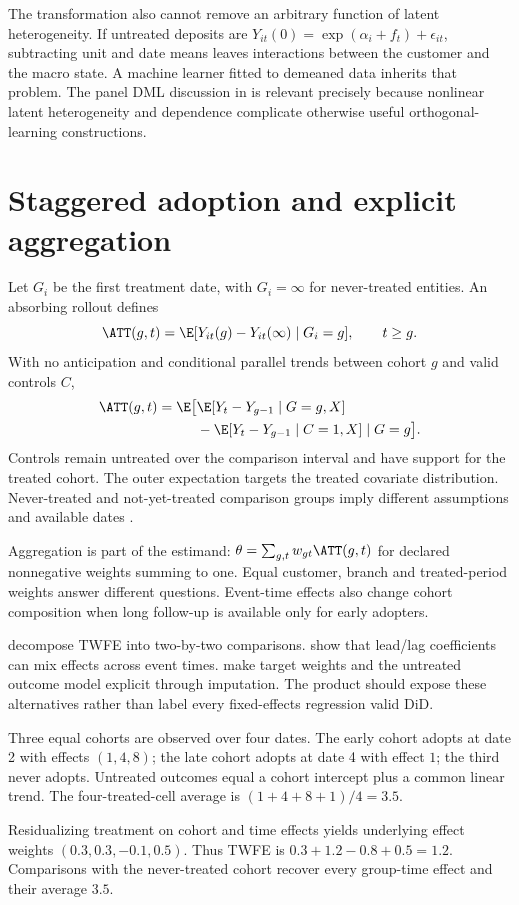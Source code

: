 The transformation also cannot remove an arbitrary function of latent
heterogeneity. If untreated deposits are
$Y_{it}(0)=\exp(\alpha_i+f_t)+\epsilon_{it}$, subtracting unit and
date means leaves interactions between the customer and the macro state.
A machine learner fitted to demeaned data inherits that problem. The panel
DML discussion in \citet{paneldml2024} is relevant precisely because
nonlinear latent heterogeneity and dependence complicate otherwise useful
orthogonal-learning constructions.

\section{Staggered adoption and explicit aggregation}
Let $G_i$ be the first treatment date, with $G_i=\infty$ for never-treated
entities. An absorbing rollout defines
\[
 \ATT(g,t)=\E[Y_{it}(g)-Y_{it}(\infty)\mid G_i=g],\qquad t\geq g.
\]
With no anticipation and conditional parallel trends between cohort $g$ and
valid controls $C$,
\begin{align}
 \ATT(g,t)=\E\big[&
 \E[Y_t-Y_{g-1}\mid G=g,X]\nonumber\\
 &-\E[Y_t-Y_{g-1}\mid C=1,X]\mid G=g\big].
 \label{eq:gtatt}
\end{align}
Controls remain untreated over the comparison interval and have support for
the treated cohort. The outer expectation targets the treated covariate
distribution. Never-treated and not-yet-treated comparison groups imply
different assumptions and available dates \citep{callaway2021}.

Aggregation is part of the estimand:
$\theta=\sum_{g,t}w_{gt}\ATT(g,t)$ for declared nonnegative weights
summing to one. Equal customer, branch and treated-period weights answer
different questions. Event-time effects also change cohort composition when
long follow-up is available only for early adopters.

\citet{bacon2021} decompose TWFE into two-by-two comparisons.
\citet{sun2021} show that lead/lag coefficients can mix effects across
event times. \citet{borusyak2024} make target weights and the untreated
outcome model explicit through imputation. The product should expose these
alternatives rather than label every fixed-effects regression valid DiD.

\begin{example}
Three equal cohorts are observed over four dates. The early cohort adopts
at date 2 with effects $(1,4,8)$; the late cohort adopts at date 4 with
effect $1$; the third never adopts. Untreated outcomes equal a cohort
intercept plus a common linear trend. The four-treated-cell average is
$(1+4+8+1)/4=3.5$.

Residualizing treatment on cohort and time effects yields underlying effect
weights $(0.3,0.3,-0.1,0.5)$. Thus TWFE is
$0.3+1.2-0.8+0.5=1.2$. Comparisons with the never-treated cohort recover
every group-time effect and their average $3.5$.
\end{example}

